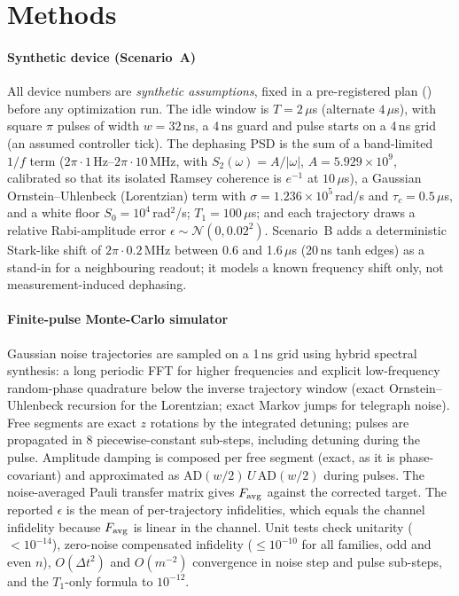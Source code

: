 \section{Methods}
\label{sec:methods}

\paragraph{Synthetic device (Scenario~A)} All device numbers are \emph{synthetic assumptions},
fixed in a pre-registered plan () before any optimization run.
The idle window is $T=2\,\mu$s (alternate $4\,\mu$s), with square $\pi$ pulses of width
$w=32$\,ns, a 4\,ns guard and pulse starts on a 4\,ns grid (an assumed controller tick).
The dephasing PSD is the sum of a band-limited $1/f$ term ($2\pi\cdot1$\,Hz--$2\pi\cdot10$\,MHz,
with $S_2(\omega)=A/|\omega|$, $A=5.929\times10^9$, calibrated so that its
isolated Ramsey coherence is $e^{-1}$ at $10\,\mu$s), a Gaussian
Ornstein--Uhlenbeck (Lorentzian) term with $\sigma=1.236\times10^5$\,rad/s
and $\tau_c=0.5\,\mu$s, and a white floor
$S_0=10^4$\,rad$^2$/s; $T_1=100\,\mu$s; and each trajectory draws a relative Rabi-amplitude error
$\epsilon\sim\mathcal N(0,0.02^2)$. Scenario~B adds a deterministic Stark-like shift of
$2\pi\cdot0.2$\,MHz between 0.6 and 1.6\,$\mu$s (20\,ns tanh edges) as a stand-in for a
neighbouring readout; it models a known frequency shift only, not measurement-induced
dephasing.

\paragraph{Finite-pulse Monte-Carlo simulator} Gaussian noise trajectories are sampled on a
1\,ns grid using hybrid spectral synthesis: a long periodic FFT for higher
frequencies and explicit low-frequency random-phase quadrature below the
inverse trajectory window (exact Ornstein--Uhlenbeck recursion for the Lorentzian;
exact Markov jumps for telegraph noise). Free segments are exact $z$ rotations by the integrated
detuning; pulses are propagated in 8 piecewise-constant sub-steps, including detuning during the
pulse. Amplitude damping is composed per free segment (exact, as it is phase-covariant) and
approximated as $\mathrm{AD}(w/2)\,U\,\mathrm{AD}(w/2)$ during pulses. The noise-averaged Pauli
transfer matrix gives $F_{\rm avg}$ against the corrected target. The reported $\epsilon$ is the
mean of per-trajectory infidelities, which equals the channel infidelity because $F_{\rm avg}$ is
linear in the channel. Unit tests check unitarity ($<10^{-14}$), zero-noise compensated infidelity
($\le10^{-10}$ for all families, odd and even $n$), $O(\Delta t^2)$ and $O(m^{-2})$ convergence
in noise step and pulse sub-steps, and the $T_1$-only formula to $10^{-12}$.

